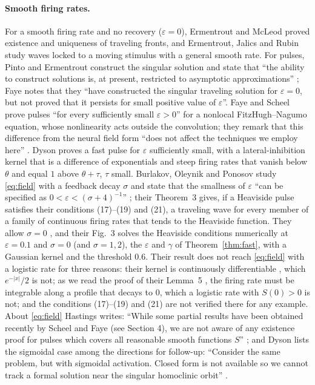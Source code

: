 \documentclass[11pt]{article}
\theoremstyle{definition}
\newcommand{\eps}{\varepsilon}
\begin{document}
\paragraph{Smooth firing rates.} For a smooth firing rate and no recovery ($\eps = 0$), Ermentrout and McLeod \cite{em1993} proved existence and uniqueness of traveling fronts, and Ermentrout, Jalics and Rubin \cite{ejr2010} study waves locked to a moving stimulus with a general smooth rate. For pulses, Pinto and Ermentrout construct the singular solution and state that ``the ability to construct solutions is, at present, restricted to asymptotic approximations'' \cite[p.~209]{pe2001}; Faye \cite[Sect.~5, p.~27 of the author's copy]{faye2013} notes that they ``have constructed the singular traveling solution for $\eps = 0$, but not proved that it persists for small positive value of $\eps$''. Faye and Scheel \cite[Theorem~1]{fs2015} prove pulses ``for every sufficiently small $\eps > 0$'' for a nonlocal FitzHugh--Nagumo equation, whose nonlinearity acts outside the convolution; they remark that this difference from the neural field form ``does not affect the techniques we employ here'' \cite[p.~3 of arXiv:1311.6508v1]{fs2015}. Dyson \cite[Theorem~1.4, p.~9]{dyson2018} proves a fast pulse for $\eps$ sufficiently small, with a lateral-inhibition kernel that is a difference of exponentials and steep firing rates that vanish below $\theta$ and equal $1$ above $\theta + \tau$, $\tau$ small. Burlakov, Oleynik and Ponosov \cite{bop2025} study \eqref{eq:field} with a feedback decay $\sigma$ and state that the smallness of $\eps$ ``can be specified as $0 < \eps < (\sigma + 4)^{-1}$'' \cite[p.~2]{bop2025}; their Theorem~3 \cite[p.~14]{bop2025} gives, if a Heaviside pulse satisfies their conditions (17)--(19) and (21), a traveling wave for every member of a family of continuous firing rates that tends to the Heaviside function. They allow $\sigma = 0$ \cite[p.~7]{bop2025}, and their Fig.~3 \cite[p.~12]{bop2025} solves the Heaviside conditions numerically at $\eps = 0.1$ and $\sigma = 0$ (and $\sigma = 1, 2$), the $\eps$ and $\gamma$ of Theorem~\ref{thm:fast}, with a Gaussian kernel and the threshold $0.6$. Their result does not reach \eqref{eq:field} with a logistic rate for three reasons: their kernel is continuously differentiable \cite[(A1), p.~5]{bop2025}, which $e^{-|x|}/2$ is not; as we read the proof of their Lemma~5 \cite[p.~7]{bop2025}, the firing rate must be integrable along a profile that decays to $0$, which a logistic rate with $S(0) > 0$ is not; and the conditions (17)--(19) and (21) are not verified there for any example. About \eqref{eq:field} Hastings writes: ``While some partial results have been obtained recently by Scheel and Faye (see Section 4), we are not aware of any existence proof for pulses which covers all reasonable smooth functions $S$'' \cite[Sect.~1, p.~2 of arXiv:1503.04057v2]{hastings2017}; and Dyson lists the sigmoidal case among the directions for follow-up: ``Consider the same problem, but with sigmoidal activation. Closed form is not available so we cannot track a formal solution near the singular homoclinic orbit'' \cite[Discussion, p.~26]{dyson2025}.
\end{document}
